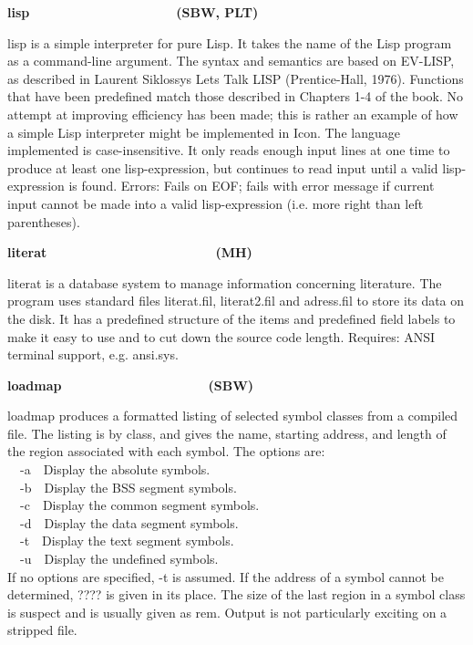 {{\sffamily\bfseries
lisp\ \ \ \ \ \ \ \ \ \ \ \ \ \ \ \ \ \ \ \  (SBW, PLT)}

\textsf{lisp} is a simple interpreter for pure Lisp. It
takes the name of the Lisp program as a command-line argument. The
syntax and semantics are based on EV-LISP, as described in Laurent
Siklossy{\textquotesingle}s {\textquotedbl}Let{\textquotesingle}s Talk
LISP{\textquotedbl} (Prentice-Hall, 1976). Functions that have been
predefined match those described in Chapters 1-4 of the book. No
attempt at improving efficiency has been made; this is rather an
example of how a simple Lisp interpreter might be implemented in Icon.
The language implemented is case-insensitive. It only reads enough
input lines at one time to produce at least one lisp-expression, but
continues to read input until a valid lisp-expression is found. Errors:
Fails on EOF; fails with error message if current input cannot be made
into a valid lisp-expression (i.e. more right than left parentheses). 

{\sffamily\bfseries
literat\ \ \ \ \ \ \ \ \ \ \ \ \ \ \ \ \ \ \ \ \ \  \ (MH)}

\textsf{literat} is a database system to manage
information concerning literature. The program uses
standard files \textsf{literat.fil}, \textsf{literat2.fil} and
\textsf{adress.fil} to store its data on the disk. It has a predefined
structure of the items and predefined field labels to make it easy to
use and to cut down the source code length. Requires: ANSI terminal
support, e.g. \textsf{ansi.sys}.

{\sffamily\bfseries
loadmap\ \ \ \ \ \ \ \ \ \ \ \ \ \ \ \ \ \ \ \ (SBW)}

\textsf{loadmap} produces a formatted listing of selected symbol classes
from a compiled file. The listing is by class, and gives the name,
starting address, and length of the region associated with each symbol.
The options are:\\
\ \ \textsf{{}-a}\ \ Display the absolute symbols.\\
\ \ \textsf{{}-b}\ \ Display the BSS segment symbols.\\
\ \ \textsf{{}-c}\ \ Display the common segment symbols.\\
\ \ \textsf{{}-d}\ \ Display the data segment symbols.\\
\ \ \textsf{{}-t}\ \ Display the text segment symbols.\\
\ \ \textsf{{}-u}\ \ Display the undefined symbols.\\
If no options are specified, \textsf{{}-t} is assumed. If the address of
a symbol cannot be determined, ???? is given in its place. The size of
the last region in a symbol class is suspect and is usually given as
rem. Output is not particularly exciting on a stripped file.

}

